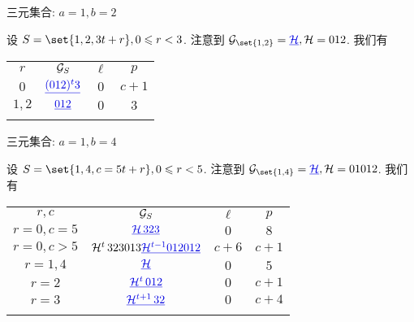 \documentclass[aspectratio=169]{ctexbeamer}
\renewcommand\ul[1]{{\color{main}\underline{#1}}}
\begin{document}
\begin{frame}{三元集合: $a=1,b=2$}
  \onslide<+->
  \begin{example}
    设 $S=\set{1,2,3t+r},0\le r<3$.
    注意到 $\CG_\set{1,2}=\ul\CH, \CH=012$.
    我们有
    \begin{center}
      \begin{tabular}{cccc}
        \topcolorrule
        $r$ & ${\mathcal{G}}_S$ & $\ell$ & $p$\\
        \midcolorrule
        $0$ & $\ul{(012)^t3}$ & $0$ & $c+1$\\
        $1,2$ & $\ul{012}$ & $0$ & $3$\\
        \bottomcolorrule
      \end{tabular}
    \end{center}
  \end{example}
\end{frame}


\begin{frame}{三元集合: $a=1,b=4$}
  \onslide<+->
  \begin{example}
    设 $S=\set{1,4,c=5t+r}, 0\le r<5$.
    注意到 $\CG_\set{1,4}=\ul{\CH}, \CH=01012$.
    我们有
    \begin{center}
      \begin{tabular}{cccc}
        \topcolorrule
        $r,c$ & ${\mathcal{G}}_S$ & $\ell$ & $p$\\
        \midcolorrule
        $r=0, c=5$ & $\ul{\CH\,323}$ & $0$ & $8$\\
        $r=0, c>5$ & $\CH^t\,323013\ul{\CH^{t-1}012012}$ & $c+6$ & $c+1$\\
        $r=1,4$ & $\ul\CH$ & $0$ & $5$\\
        $r=2$ & $\ul{\CH^t\,012}$ & $0$ & $c+1$\\
        $r=3$ & $\ul{\CH^{t+1}\,32}$ & $0$ & $c+4$\\
        \bottomcolorrule
      \end{tabular}
    \end{center}
  \end{example}
\end{frame}
\end{document}
